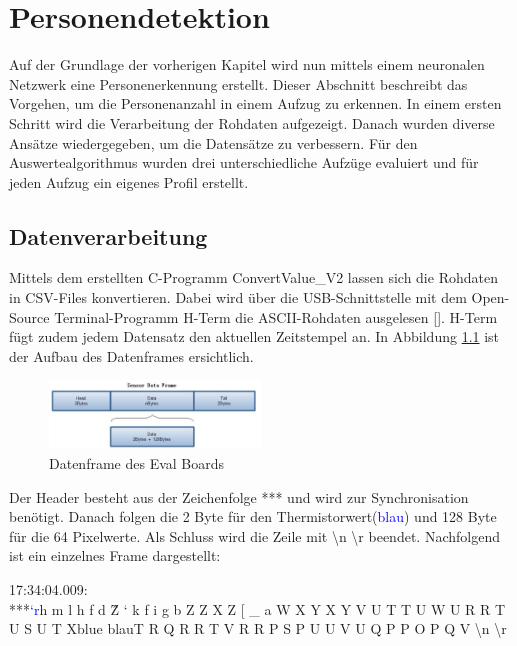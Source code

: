 \chapter{Personendetektion}
\label{chap:Personendetektion}

Auf der Grundlage der vorherigen Kapitel wird nun mittels einem neuronalen Netzwerk eine Personenerkennung erstellt. Dieser Abschnitt beschreibt das Vorgehen, um die Personenanzahl in einem Aufzug zu erkennen. In einem ersten Schritt wird die Verarbeitung der Rohdaten aufgezeigt. Danach wurden diverse Ansätze wiedergegeben, um die Datensätze zu verbessern. Für den Auswertealgorithmus wurden drei unterschiedliche Aufzüge evaluiert und für jeden Aufzug ein eigenes Profil erstellt. 

\section{Datenverarbeitung}

Mittels dem erstellten C-Programm ConvertValue\_V2 lassen sich die Rohdaten in \ac{CSV}-Files konvertieren. Dabei wird über die USB-Schnittstelle mit dem Open-Source Terminal-Programm H-Term die \ac{ASCII}-Rohdaten ausgelesen [\protect\cite{HTERM}].
H-Term fügt zudem jedem Datensatz den aktuellen Zeitstempel an. In Abbildung \ref{fig:Dataframe} ist der Aufbau des Datenframes ersichtlich.

\begin{figure}[H]
	\centering
	\includegraphics[width=0.5\textwidth]
	{fig/Dataframe}
	\caption[Datenframedes EVAL Boards]{Datenframe des Eval Boards}
	\label{fig:Dataframe}
\end{figure}

Der Header besteht aus der Zeichenfolge *** und wird zur Synchronisation benötigt. Danach folgen die 2 Byte für den Thermistorwert(\textcolor{blue}{blau}) und 128 Byte für die 64 Pixelwerte. Als Schluss wird die Zeile mit \textbackslash n \textbackslash r beendet.
Nachfolgend ist ein einzelnes Frame dargestellt:

17:34:04.009: \\
***\textcolor{blue}{‘r}h m l h f d \^ Z ` k f i g b Z Z X Z [ \_ a W X Y X Y V U T T U W U R R T U S U T Xblue {blau}T R Q R R T V R R P S P U U V U Q P P O P Q V  \textbackslash n \textbackslash r \\


